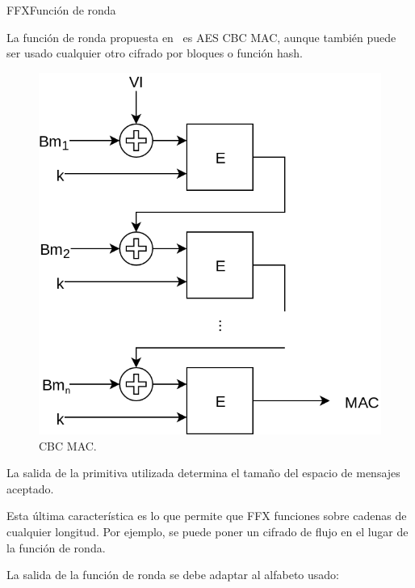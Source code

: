 \begin{frame}{FFX}{Función de ronda}

  {
    La función de ronda propuesta en~\cite{ffx_2} es AES CBC MAC, aunque también
    puede ser usado cualquier otro cifrado por bloques o función hash.

    \begin{figure}[H]
      \begin{center}
        \includegraphics[height=0.35\textheight]{diagramas/cbc_mac.png}
        \caption{CBC MAC.}
      \end{center}
    \end{figure}

    La salida de la primitiva utilizada determina el tamaño del espacio de
    mensajes aceptado.
  }

  {
    Esta última característica es lo que permite que FFX funciones sobre
    cadenas de cualquier longitud. Por ejemplo, se puede poner un cifrado
    de flujo en el lugar de la función de ronda.
  }

  {
    La salida de la función de ronda se debe adaptar al alfabeto usado:

    \begin{itemize}


\end{itemize}}
\end{frame}
